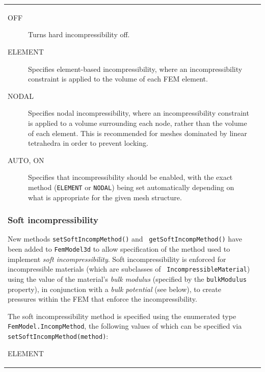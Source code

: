 \documentclass{article}
\begin{document}
\begin{tabular}{ll}
\begin{description}

\item[OFF] \mbox{}

Turns hard incompressibility off.

\item[ELEMENT] \mbox{}
 
Specifies element-based incompressibility,
where an incompressibility constraint is applied to the volume of each
FEM element. 

\item[NODAL] \mbox{}
 
Specifies nodal incompressibility, where an
incompressibility constraint is applied to a volume surrounding each
node, rather than the volume of each element. This is recommended for
meshes dominated by linear tetrahedra in order to prevent locking.

\item[AUTO, ON] \mbox{}

Specifies that incompressibility should be enabled, with the
exact method  ({\tt ELEMENT} or {\tt NODAL}) being
set automatically depending
on what is appropriate for the given mesh structure.

\end{description}

\subsubsection*{Soft incompressibility}

New methods {\tt setSoftIncompMethod()} and {\tt
getSoftIncompMethod()} have been added to {\tt FemModel3d} to allow
specification of the method used to implement {\it soft
incompressibility}. Soft incompressibility is enforced for
incompressible materials (which are subclasses of {\tt
IncompressibleMaterial}) using the value of the material's {\it bulk
modulus} (specified by the {\tt bulkModulus} property), in conjunction
with a {\it bulk potential} (see below), to create pressures within
the FEM that enforce the incompressibility.

The soft incompressibility method is specified using the enumerated
type {\tt FemModel.IncompMethod}, the following values of which can be
specified via {\tt setSoftIncompMethod(method)}:

\begin{description}

\item[ELEMENT] \mbox{}
 

\end{description}
\end{tabular}
\end{document}
